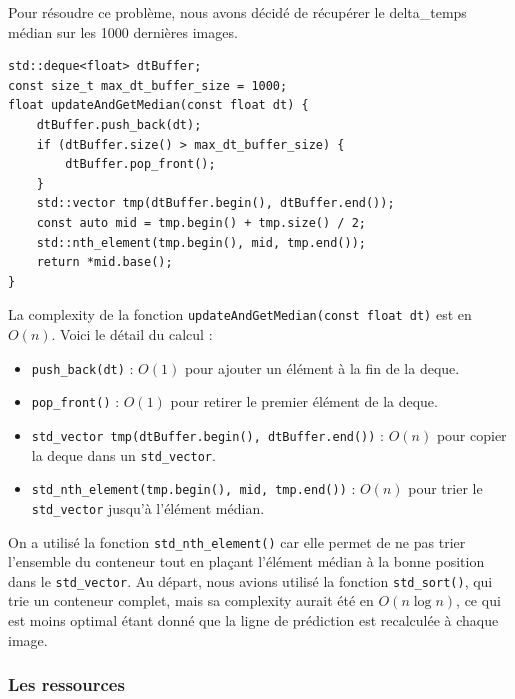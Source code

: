 Pour résoudre ce problème, nous avons décidé de récupérer le \gls{delta_temps} médian sur les 1000 dernières images.

\begin{lstlisting}[style=CStyle, label={lst:code_dequeue_dt}]
std::deque<float> dtBuffer;
const size_t max_dt_buffer_size = 1000;
float updateAndGetMedian(const float dt) {
    dtBuffer.push_back(dt);
    if (dtBuffer.size() > max_dt_buffer_size) {
        dtBuffer.pop_front();
    }
    std::vector tmp(dtBuffer.begin(), dtBuffer.end());
    const auto mid = tmp.begin() + tmp.size() / 2;
    std::nth_element(tmp.begin(), mid, tmp.end());
    return *mid.base();
}
\end{lstlisting}

La \gls{complexity} de la fonction \texttt{updateAndGetMedian(const float dt)} est en \( O(n) \).
Voici le détail du calcul :
\begin{itemize}
    \item \texttt{push\_back(dt)} : \( O(1) \)\cite{cpp_reference_push_back} pour ajouter un élément à la fin de la \gls{deque}.
    \item \texttt{pop\_front()} : \( O(1) \)\cite{cpp_reference_pop_front} pour retirer le premier élément de la \gls{deque}.
    \item \texttt{\gls{std_vector} tmp(dtBuffer.begin(), dtBuffer.end())} : \( O(n) \)\cite{cpp_reference_vector} pour copier la \gls{deque} dans un \texttt{\gls{std_vector}}.
    \item \texttt{\gls{std_nth_element}(tmp.begin(), mid, tmp.end())} : \( O(n) \)\cite{cpp_reference_std_nth_element} pour trier le \texttt{\gls{std_vector}} jusqu'à l'élément médian.
\end{itemize}

On a utilisé la fonction \texttt{\gls{std_nth_element}()}\cite{cpp_reference_std_nth_element} car elle permet de ne pas trier l'ensemble du conteneur tout en plaçant l'élément médian à la bonne position dans le \texttt{\gls{std_vector}}\cite{cpp_reference_vector}.
Au départ, nous avions utilisé la fonction \texttt{\gls{std_sort}()}, qui trie un conteneur complet, mais sa \gls{complexity} aurait été en \( O(n \log n) \)\cite{cpp_reference_std_sort}, ce qui est moins optimal étant donné que la ligne de prédiction est recalculée à chaque image.


\subsubsection{Les ressources}\label{subsubsec:gestion-des-ressources}
